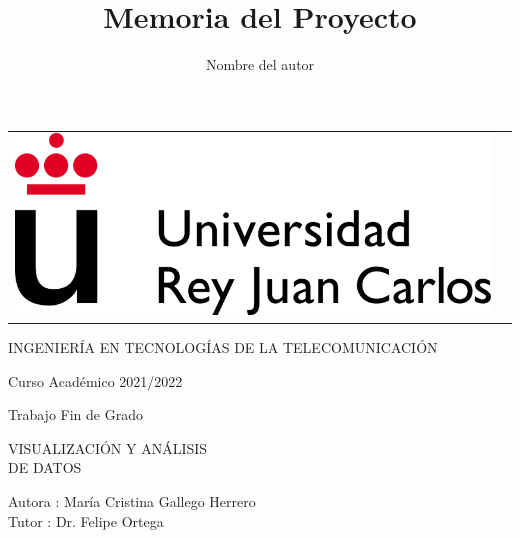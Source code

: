 \documentclass[a4paper, 12pt]{book}
\title{Memoria del Proyecto}
\author{Nombre del autor}
\begin{document}
 


\begin{titlepage}
\begin{center}
\begin{tabular}[c]{c c}
\includegraphics[scale=1.5]{img/LogoURJC.png}
\\
\end{tabular}

\vspace{3cm}

\Large 
INGENIERÍA EN TECNOLOGÍAS DE LA TELECOMUNICACIÓN 

\vspace{0.4cm}

\large
Curso Académico 2021/2022

\vspace{0.8cm}

Trabajo Fin de Grado

\vspace{2cm}

\LARGE VISUALIZACIÓN Y ANÁLISIS\\
DE DATOS 
\vspace{3cm}

\large
Autora : María Cristina Gallego Herrero \\
Tutor : Dr. Felipe Ortega 
\end{center}
\end{titlepage}
\end{document}
